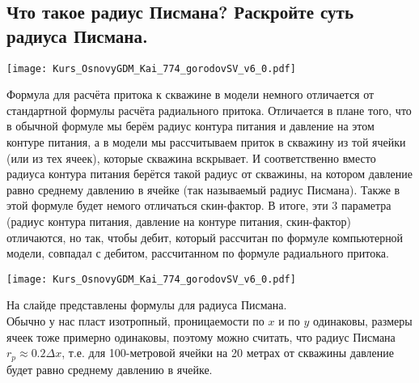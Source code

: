 

\subsection{Что такое радиус Писмана? Раскройте суть радиуса Писмана.}

\texttt{[image: Kurs\_OsnovyGDM\_Kai\_774\_gorodovSV\_v6\_0.pdf]}

Формула для расчёта притока к скважине в модели немного отличается от стандартной формулы расчёта радиального притока.
Отличается в плане того, что в обычной формуле мы берём радиус контура питания и давление на этом контуре питания, а в модели мы рассчитываем приток в скважину из той ячейки (или из тех ячеек), которые скважина вскрывает.
И соответственно вместо радиуса контура питания берётся такой радиус от скважины, на котором давление равно среднему давлению в ячейке (так называемый радиус Писмана).
Также в этой формуле будет немого отличаться скин-фактор.
В итоге, эти 3 параметра (радиус контура питания, давление на контуре питания, скин-фактор) отличаются, но так, чтобы дебит, который рассчитан по формуле компьютерной модели, совпадал с дебитом, рассчитанном по формуле радиального притока.

\texttt{[image: Kurs\_OsnovyGDM\_Kai\_774\_gorodovSV\_v6\_0.pdf]}

На слайде представлены формулы для радиуса Писмана.
\\

Обычно у нас пласт изотропный, проницаемости по $x$ и по $y$ одинаковы, размеры ячеек тоже примерно одинаковы, поэтому можно считать, что радиус Писмана $r_p\approx0.2\Delta x$, т.е. для 100-метровой ячейки на 20 метрах от скважины давление будет равно среднему давлению в ячейке.


